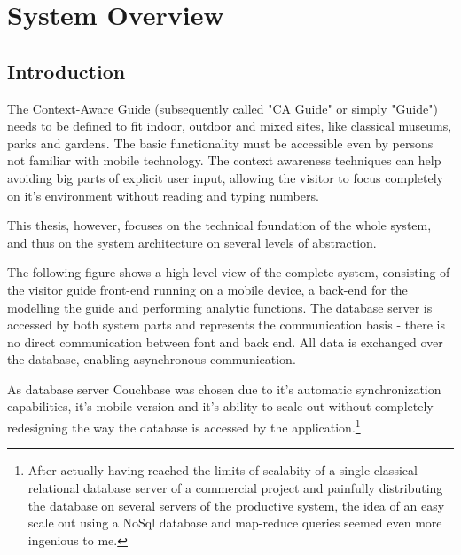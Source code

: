 
\chapter{System Overview} %

\label{systemoverview} %



\section{Introduction}

The Context-Aware Guide (subsequently called "CA Guide" or simply "Guide") needs to be defined to fit indoor, outdoor and mixed sites, like classical museums, parks and gardens. 
The basic functionality must be accessible even by persons not familiar with mobile technology. The context awareness techniques can help avoiding big parts of explicit user input, allowing the visitor to focus completely on it's environment without reading and typing numbers.

This thesis, however, focuses on the technical foundation of the whole system, and thus on the system architecture on several levels of abstraction. 

The following figure shows a high level view of the complete system, consisting of the visitor guide front-end running on a mobile device, a back-end for the modelling the guide and performing analytic functions. The database server is accessed by both system parts and represents the communication basis - there is no direct communication between font and back end. All data is exchanged over the database, enabling asynchronous communication.

As database server Couchbase was chosen due to it's automatic synchronization capabilities, it's mobile version and it's ability to scale out without completely redesigning the way the database is accessed by the application.\footnote{After actually having reached the limits of scalabity of a single classical relational database server of a commercial project and painfully distributing the database on several servers of the productive system, the idea of an easy scale out using a NoSql database and map-reduce queries seemed even more ingenious to me.} 

